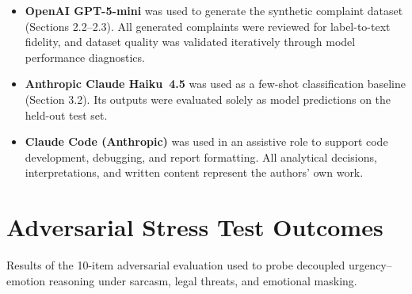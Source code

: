 \documentclass[11pt]{article}
\begin{document}
\begin{itemize}
  \item \textbf{OpenAI GPT-5-mini} was used to generate the synthetic complaint
    dataset (Sections 2.2--2.3). All generated complaints were reviewed for
    label-to-text fidelity, and dataset quality was validated iteratively through
    model performance diagnostics.
  \item \textbf{Anthropic Claude Haiku~4.5} was used as a few-shot classification
    baseline (Section 3.2). Its outputs were evaluated solely as model predictions
    on the held-out test set.
  \item \textbf{Claude Code (Anthropic)} was used in an assistive role to support
    code development, debugging, and report formatting. All analytical decisions,
    interpretations, and written content represent the authors' own work.
\end{itemize}


\section{Adversarial Stress Test Outcomes}

Results of the 10-item adversarial evaluation used to probe decoupled urgency--emotion
reasoning under sarcasm, legal threats, and emotional masking.
\end{document}

